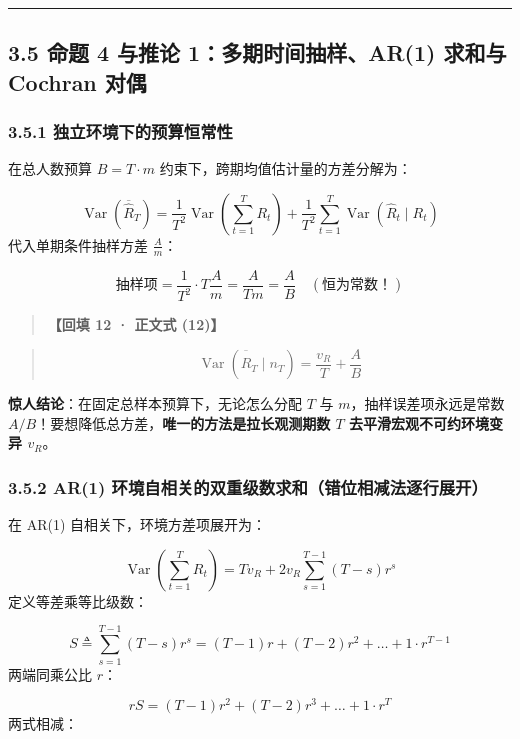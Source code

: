 \documentclass[11pt,a4paper]{ctexart}
\begin{document}
\vspace{0.8em}\hrule\vspace{0.8em}

\subsection{3.5 命题 4 与推论 1：多期时间抽样、AR(1) 求和与 Cochran 对偶}

\subsubsection{3.5.1 独立环境下的预算恒常性}
在总人数预算 $B = T \cdot m$ 约束下，跨期均值估计量的方差分解为：

\[
\operatorname{Var}(\overline{\widehat{R}}_T) = \frac{1}{T^2}\operatorname{Var}\left(\sum_{t=1}^T R_t\right) + \frac{1}{T^2}\sum_{t=1}^T \operatorname{Var}(\widehat{R}_t \mid R_t)
\]
代入单期条件抽样方差 $\frac{A}{m}$：

\[
\text{抽样项} = \frac{1}{T^2} \cdot T \frac{A}{m} = \frac{A}{Tm} = \frac{A}{B} \quad (\text{恒为常数！})
\]

\begin{quote}\small\color{black!75}
\textbf{【回填 12 · 正文式 (12)】}
\end{quote}
\begin{quote}\small\color{black!75}
\begin{equation*}
\operatorname{Var}(\overline{\widehat{R}}_T \mid n_T) = \frac{v_R}{T} + \frac{A}{B} \tag{eq:var\_budget\_indep}
\end{equation*}
\end{quote}

\textbf{惊人结论}：在固定总样本预算下，无论怎么分配 $T$ 与 $m$，抽样误差项永远是常数 $A/B$！要想降低总方差，\textbf{唯一的方法是拉长观测期数 $T$ 去平滑宏观不可约环境变异 $v_R$}。


\subsubsection{3.5.2 AR(1) 环境自相关的双重级数求和（错位相减法逐行展开）}
在 AR(1) 自相关下，环境方差项展开为：

\[
\operatorname{Var}\left(\sum_{t=1}^T R_t\right) = T v_R + 2 v_R \sum_{s=1}^{T-1} (T-s) r^s
\]
定义等差乘等比级数：

\[
S \triangleq \sum_{s=1}^{T-1} (T-s) r^s = (T-1)r + (T-2)r^2 + \dots + 1 \cdot r^{T-1}
\]
两端同乘公比 $r$：

\[
r S = (T-1)r^2 + (T-2)r^3 + \dots + 1 \cdot r^T
\]
两式相减：
\end{document}

